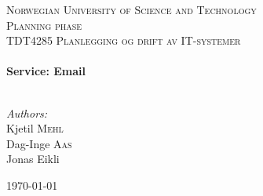 
\begin{titlepage}

\begin{center}
 

\textsc{\LARGE Norwegian University of Science and Technology}\\[1.5cm]

 
\textsc{\Large Planning phase}\\[0.5cm]

\textsc{\large TDT4285 Planlegging og drift av IT-systemer}\\[0.5cm]
 
 
\HRule \\[0.4cm]
{ \huge \bfseries Service: Email}\\[0.4cm]
 
\HRule \\[1.5cm]
 

\begin{center} \Large
\emph{Authors:}\\
Kjetil \textsc{Mehl}\\
Dag-Inge \textsc{Aas}\\
Jonas Eikli\\[3cm]
\end{center}
 

{\large \today}\\[4cm] %
 
\vfill
\end{center}

\end{titlepage}
